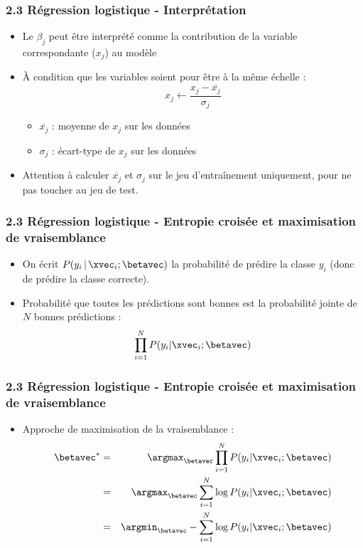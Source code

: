 \begin{frame}
  \frametitle{2.3 Régression logistique - Interprétation}
  \begin{itemize}
  \item Le 
    $\beta_j$ peut être interprété comme la contribution de la variable correspondante ($x_j$) au modèle
  \item À condition que les variables soient  pour être à la même échelle :
    \[
      x_j \leftarrow \frac{x_j - \overline{x_j}}{\sigma_j}
    \]
    \begin{itemize}
    \item $\overline{x_j}$ : moyenne de $x_j$ sur les données
    \item $\sigma_j$ : écart-type de $x_j$ sur les données
    \end{itemize}
  \item Attention à calculer $\overline{x_j}$ et $\sigma_j$ sur le jeu
    d'entraînement uniquement, pour ne pas toucher au jeu de test.
  \end{itemize}
\end{frame}

\begin{frame}
  \frametitle{2.3 Régression logistique - Entropie croisée et maximisation de vraisemblance}
  \begin{itemize}
    \item On écrit $P(y_i\,|\,\xvec_i; \betavec)$ la probabilité de prédire la classe $y_i$ (donc de prédire la classe correcte). 
  \item Probabilité que toutes les prédictions sont bonnes est la probabilité jointe de $N$ bonnes prédictions :  
  \begin{equation*}
    \prod_{i=1}^NP(y_i | \xvec_i; \betavec)
  \end{equation*}
  \end{itemize}
\end{frame}

\begin{frame}
  \frametitle{2.3 Régression logistique - Entropie croisée et maximisation de vraisemblance}
  \begin{itemize}
    \item Approche de maximisation de la vraisemblance : 
    \begin{eqnarray*}
    \betavec^{\ast} &=& \argmax_{\betavec} \prod_{i=1}^NP(y_i | \xvec_i; \betavec) \\
                  &=& \argmax _{\betavec} \sum_{i=1}^N\log P(y_i | \xvec_i; \betavec)\\
                  &=& \argmin_{\betavec} - \sum_{i=1}^N\log P(y_i | \xvec_i; \betavec)
    \end{eqnarray*}    
  \end{itemize}
\end{frame}

